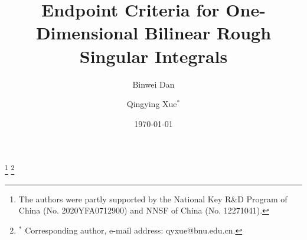 \documentclass[11pt]{amsart}
\theoremstyle{remark}
\numberwithin{equation}{section}
\begin{document}
	
	\author[B. Dan]{Binwei Dan}
	\address{Binwei Dan:
		School of Mathematical Sciences \\
		Beijing Normal University \\
		Laboratory of Mathematics and Complex Systems \\
		Ministry of Education \\
		Beijing 100875 \\
		People's Republic of China}
	
	\author[Q. Xue]{Qingying Xue\(^{*}\)}
	\address{Qingying Xue:
		School of Mathematical Sciences \\
		Beijing Normal University \\
		Laboratory of Mathematics and Complex Systems \\
		Ministry of Education \\
		Beijing 100875 \\
		People's Republic of China}
	
	
	\thanks{The authors were partly supported by the National Key R\&D Program of China (No. 2020YFA0712900) and NNSF of China (No. 12271041).}
	\thanks{\(^{*}\) Corresponding author, e-mail address: qyxue@bnu.edu.cn.}
	
	\date{\today}
	\title[Endpoint criteria for bilinear rough singular integrals]
	{Endpoint Criteria for One-Dimensional Bilinear Rough Singular Integrals}
	
\end{document}
